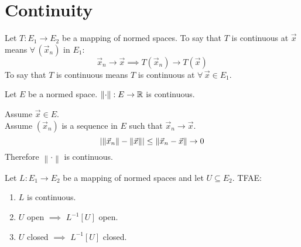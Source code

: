 \documentclass[letterpaper,12pt,fleqn]{article}
\newcommand{\vx}{\vec{x}}
\newcommand{\norm}[1]{\left\|#1\right\|}
\begin{document}
\section*{Continuity}

\begin{definition}[Continuous]
  Let $T:E_1\to E_2$ be a mapping of normed spaces. To say that $T$ is
  continuous at $\vx$ means $\forall\,(\vx_n)$ in $E_1$:
  \[\vx_n\to\vx\implies T(\vx_n)\to T(\vx)\]
  To say that $T$ is continuous means $T$ is continuous at
  $\forall\,\vx\in E_1$.
\end{definition}

\begin{theorem}
  Let $E$ be a normed space. $\norm{\cdot}:E\to\R$ is continuous.
\end{theorem}

\begin{theproof}
  Assume $\vx\in E$. \\
  Assume $(\vx_n)$ is a sequence in $E$ such that $\vx_n\to\vx$.
  \[\abs{\norm{\vx_n}-\norm{\vx}}\le\norm{\vx_n-\vx}\to0\]
  Therefore $\norm{\cdot}$ is continuous.
\end{theproof}

\begin{theorem}
  Let $L:E_1\to E_2$ be a mapping of normed spaces and let $U\subseteq E_2$.
  TFAE:
  \begin{enumerate}
  \item $L$ is continuous.
  \item $U$ open $\implies$ $L^{-1}[U]$ open.
  \item $U$ closed $\implies$ $L^{-1}[U]$ closed.
  \end{enumerate}
\end{theorem}
\end{document}
